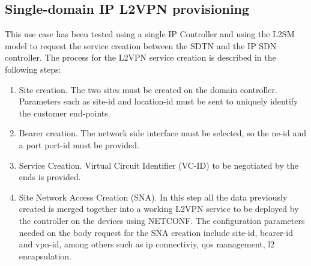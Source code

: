 \documentclass[a4paper,fleqn]{cas-dc}
\begin{document}
\subsection{Single-domain IP L2VPN provisioning}

This use case has been tested using a single IP Controller and using the L2SM model to request the service creation between the SDTN and the IP SDN controller. The process for the L2VPN service creation is described in the following steps:

\begin{enumerate}
    \item Site creation. The two sites must be created on the domain controller. Parameters such as site-id and location-id must be sent to uniquely identify the customer end-points.
    \item Bearer creation. The network side interface must be selected, so the ne-id and a port port-id must be provided.
    \item Service Creation. Virtual Circuit Identifier (VC-ID) to be negotiated by the ends is provided.  
    \item Site Network Access Creation (SNA). In this step all the data previously created is merged together into a working L2VPN service to be deployed by the controller on the devices using NETCONF. The configuration parameters needed on the body request for the SNA creation include site-id, bearer-id and vpn-id, among others such as ip connectiviy, qos management, l2 encapsulation. 
\end{enumerate}
\end{document}
